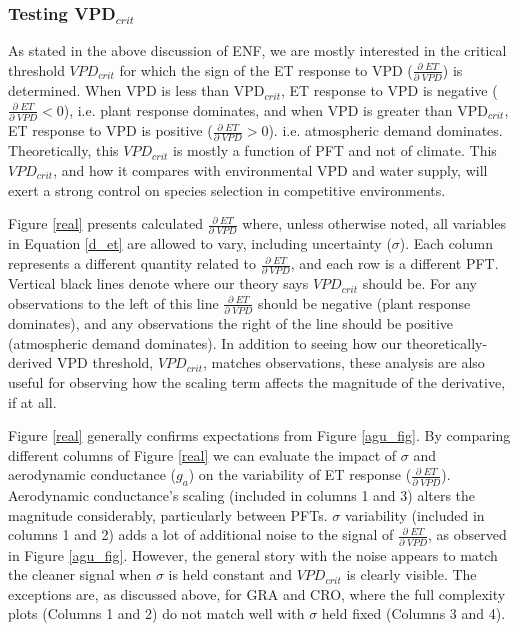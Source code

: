 \documentclass[draft,linenumbers]{agujournal}
\begin{document}
\subsubsection{Testing VPD$_{crit}$}
As stated in the above discussion of ENF, we are mostly interested in the critical threshold $VPD_{crit}$ for which the sign of the ET response to VPD ($\frac{\partial \; ET}{\partial \; VPD}$) is determined. When VPD is less than VPD$_{crit}$, ET response to VPD is negative ($\frac{\partial \; ET}{\partial \; VPD}  < 0$), i.e. plant response dominates, and when VPD is greater than VPD$_{crit}$, ET response to VPD is positive  ($\frac{\partial \; ET}{\partial \; VPD} > 0$). i.e. atmospheric demand dominates. Theoretically, this $VPD_{crit}$ is mostly a function of PFT and not of climate. This $VPD_{crit}$, and how it compares with environmental VPD and water supply, will exert a strong control on species selection in competitive environments. 

Figure \ref{real} presents calculated $\frac{\partial \; ET}{\partial \; VPD}$ where, unless otherwise noted, all variables in Equation \ref{d_et} are allowed to vary, including uncertainty ($\sigma$). Each column represents a different quantity related to $\frac{\partial \; ET}{\partial \; VPD}$, and each row is a different PFT. Vertical black lines denote where our theory says $VPD_{crit}$ should be. For any observations to the left of this line $\frac{\partial \; ET}{\partial \; VPD}$ should be negative (plant response dominates), and any observations the right of the line should be positive (atmospheric demand dominates). In addition to seeing how our theoretically-derived VPD threshold, $VPD_{crit}$, matches observations, these analysis are also useful for observing how the scaling term affects the magnitude of the derivative, if at all. 

Figure \ref{real} generally confirms expectations from Figure \ref{agu_fig}. By comparing different columns of Figure \ref{real} we can evaluate the impact of $\sigma$ and aerodynamic conductance ($g_a$) on the variability of ET response ($\frac{\partial \; ET}{\partial \; VPD}$). Aerodynamic conductance's scaling (included in columns 1 and 3) alters the magnitude considerably, particularly between PFTs. $\sigma$ variability (included in columns 1 and 2) adds a lot of additional noise to the signal of $\frac{\partial \; ET}{\partial \; VPD}$, as observed in Figure \ref{agu_fig}. However, the general story with the noise appears to match the cleaner signal when $\sigma$ is held constant and $VPD_{crit}$ is clearly visible. The exceptions are, as discussed above, for GRA and CRO, where the full complexity plots (Columns 1 and 2) do not match well with $\sigma$ held fixed (Columns 3 and 4).
\end{document}
